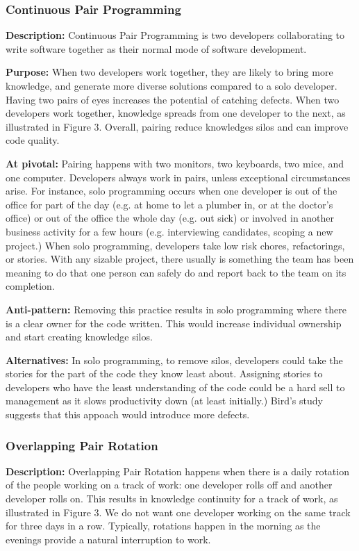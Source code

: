 \begin{table}[]
\subsubsection{Continuous Pair Programming}
\textbf{Description:} Continuous Pair Programming is two developers collaborating to write software together as their normal mode of software development.

\textbf{Purpose:} When two developers work together, they are likely to bring more knowledge, and generate more diverse solutions compared to a solo developer. Having two pairs of eyes increases the potential of catching defects. When two developers work together, knowledge spreads from one developer to the next, as illustrated in Figure 3. Overall, pairing reduce knowledges silos and can improve code quality.

\textbf{At pivotal:} Pairing happens with two monitors, two keyboards, two mice, and one computer. Developers always work in pairs, unless exceptional circumstances arise. For instance, solo programming occurs when one developer is out of the office for part of the day (e.g. at home to let a plumber in, or at the doctor's office) or out of the office the whole day (e.g. out sick) or involved in another business activity for a few hours (e.g. interviewing candidates, scoping a new project.) When solo programming, developers take low risk chores, refactorings, or stories. With any sizable project, there usually is something the team has been meaning to do that one person can safely do and report back to the team on its completion.  

\textbf{Anti-pattern:} Removing this practice results in solo programming where there is a clear owner for the code written. This would increase individual ownership and start creating knowledge silos. 

\textbf{Alternatives:}  In solo programming, to remove silos, developers could take the stories for the part of the code they know least about. Assigning stories to developers who have the least understanding of the code could be a hard sell to management as it slows productivity down (at least initially.) Bird's study \cite{BirdDontTouchMyCode} suggests that this appoach would introduce more defects. 

\subsubsection{Overlapping Pair Rotation}
\textbf{Description:} Overlapping Pair Rotation happens when there is a daily rotation of the people working on a track of work: one developer rolls off and another developer rolls on. This results in knowledge continuity for a track of work, as illustrated in Figure 3.  We do not want one developer working on the same track for three days in a row. Typically, rotations happen in the morning as the evenings provide a natural interruption to work. 


\end{table}
